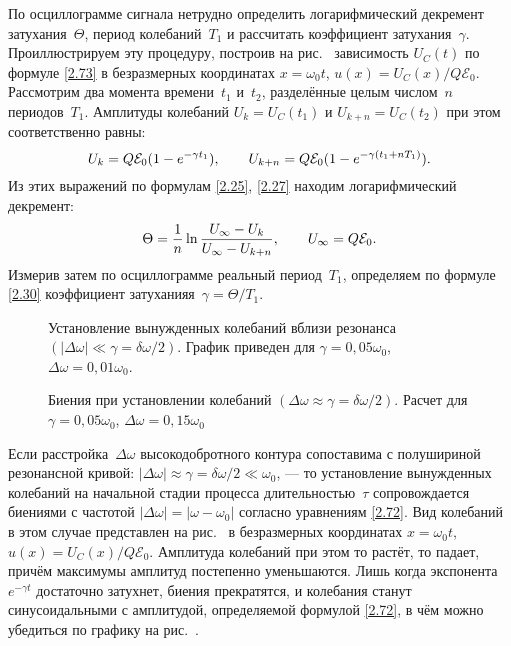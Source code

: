 По осциллограмме сигнала нетрудно определить
логарифмический декремент затухания~$\Theta$, период колебаний~$T_1$ 
и рассчитать коэффициент затухания~$\gamma$. Проиллюстрируем 
эту процедуру, построив на рис.~
зависимость $U_C(t)$ по формуле \eqref{2.73} в безразмерных координатах 
$x = \omega_0t$, $u(x) = U_C(x)/Q\mathcal{E}_0$.
Рассмотрим два момента времени~$t_1$ и~$t_2$, разделённые целым числом~$n$
периодов~$T_1$. Амплитуды колебаний $U_{k}=U_C(t_1)$ и 
$U_{k+n}=U_C(t_2)$ при этом соответственно равны:
\begin{equation*}\eqmark{2.74}
U_{k}=Q\mathcal{E}_0(1-e^{-\gamma t_1}), \qquad U_{k+n}=
Q\mathcal{E}_0(1-e^{-\gamma(t_1+nT_1)}).
\end{equation*}
Из этих выражений по формулам \eqref{2.25}, \eqref{2.27} находим логарифмический 
декремент:
\begin{equation}\eqmark{2.75}
\Theta=\dfrac{1}{n}\ln\dfrac{U_{\infty} -U_{k}}{U_{\infty} -U_{k+n}}, \qquad U_{\infty}  = 
Q\mathcal{E}_0.
\end{equation}
Измерив затем по осциллограмме реальный период~$T_1$, определяем 
по формуле \eqref{2.30} коэффициент затуханияя~$\gamma = \Theta/T_1$.

\begin{figure}[h!]
    \centering
    \caption{Установление вынужденных колебаний вблизи резонанса
        $(|\Delta\omega|\ll\gamma=\delta\omega/2)$. График приведен для
        $\gamma = 0,05\omega_0$, $\Delta \omega = 0,01\omega_0$.}
\end{figure}

\begin{figure}[h!]
    \centering
    \caption{Биения при установлении колебаний
        $(\Delta\omega\approx\gamma=\delta\omega/2)$. Расчет для
        $\gamma = 0,05\omega_0$, $\Delta \omega = 0,15\omega_0$}
\end{figure}


Если расстройка~$\Delta\omega$ высокодобротного контура сопоставима с полушириной 
резонансной кривой: $|\Delta\omega|\approx\gamma=\delta\omega/2\ll\omega_0$, --- 
то установление вынужденных колебаний на
начальной стадии процесса длительностью~$\tau$ сопровождается биениями с
частотой $|\Delta\omega|=|\omega-\omega_0|$ согласно уравнениям \eqref{2.72}.
Вид колебаний в этом случае представлен на рис.~ в безразмерных 
координатах $x = \omega_0t$, $u(x) = U_C(x)/Q\mathcal{E}_0$.
Амплитуда колебаний при этом то растёт, то падает, причём максимумы амплитуд
постепенно уменьшаются. Лишь когда экспонента~$e^{-\gamma t}$ достаточно
затухнет, биения прекратятся, и колебания станут синусоидальными с амплитудой, 
определяемой формулой \eqref{2.72}, в чём можно убедиться по графику на 
рис.~.

